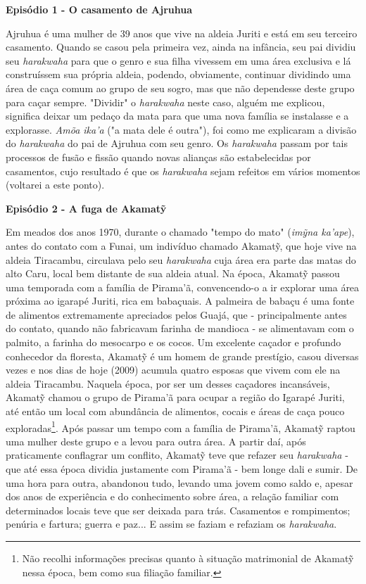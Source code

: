 \textbf{Episódio 1 - O casamento de Ajruhua}

Ajruhua é uma mulher de 39 anos que vive na aldeia Juriti e está em seu
terceiro casamento. Quando se casou pela primeira vez, ainda na
infância, seu pai dividiu seu \emph{harakwaha} para que o genro e sua
filha vivessem em uma área exclusiva e lá construíssem sua própria
aldeia, podendo, obviamente, continuar dividindo uma área de caça comum
ao grupo de seu sogro, mas que não dependesse deste grupo para caçar
sempre. "Dividir" o \emph{harakwaha} neste caso, alguém me explicou,
significa deixar um pedaço da mata para que uma nova família se
instalasse e a explorasse. \emph{Amõa ika'a} ("a mata dele é outra"),
foi como me explicaram a divisão do \emph{harakwaha} do pai de Ajruhua
com seu genro. Os \emph{harakwaha} passam por tais processos de fusão e
fissão quando novas alianças são estabelecidas por casamentos, cujo
resultado é que os \emph{harakwaha} sejam refeitos em vários momentos
(voltarei a este ponto).

\textbf{Episódio 2 - A fuga de Akamatỹ}

Em meados dos anos 1970, durante o chamado "tempo do mato" (\emph{imỹna
ka'ape}), antes do contato com a Funai, um indivíduo chamado Akamatỹ,
que hoje vive na aldeia Tiracambu, circulava pelo seu \emph{harakwaha}
cuja área era parte das matas do alto Caru, local bem distante de sua
aldeia atual. Na época, Akamatỹ passou uma temporada com a família de
Pirama'ã, convencendo-o a ir explorar uma área próxima ao igarapé
Juriti, rica em babaçuais. A palmeira de babaçu é uma fonte de alimentos
extremamente apreciados pelos Guajá, que - principalmente antes do
contato, quando não fabricavam farinha de mandioca - se alimentavam com
o palmito, a farinha do mesocarpo e os cocos. Um excelente caçador e
profundo conhecedor da floresta, Akamatỹ é um homem de grande prestígio,
casou diversas vezes e nos dias de hoje (2009) acumula quatro esposas
que vivem com ele na aldeia Tiracambu. Naquela época, por ser um desses
caçadores incansáveis, Akamatỹ chamou o grupo de Pirama'ã para ocupar a
região do Igarapé Juriti, até então um local com abundância de
alimentos, cocais e áreas de caça pouco exploradas\footnote{Não recolhi
  informações precisas quanto à situação matrimonial de Akamatỹ nessa
  época, bem como sua filiação familiar.}. Após passar um tempo com a
família de Pirama'ã, Akamatỹ raptou uma mulher deste grupo e a levou
para outra área. A partir daí, após praticamente conflagrar um conflito,
Akamatỹ teve que refazer seu \emph{harakwaha} - que até essa época
dividia justamente com Pirama'ã - bem longe dali e sumir. De uma hora
para outra, abandonou tudo, levando uma jovem como saldo e, apesar dos
anos de experiência e do conhecimento sobre área, a relação familiar com
determinados locais teve que ser deixada para trás. Casamentos e
rompimentos; penúria e fartura; guerra e paz... E assim se faziam e
refaziam os \emph{harakwaha}.

